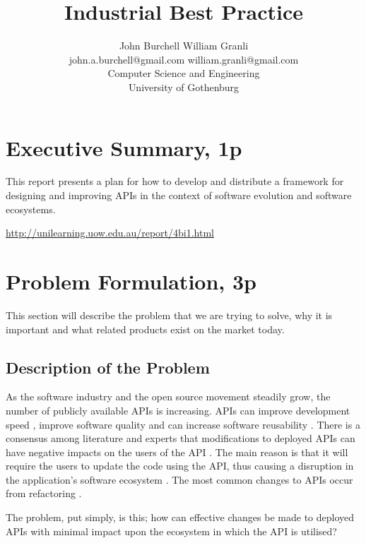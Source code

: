 \documentclass{article}
\title{Industrial Best Practice}
\begin{document}
\author{John Burchell \qquad William Granli \\
		john.a.burchell@gmail.com \qquad william.granli@gmail.com \\
		Computer Science and Engineering  \\
		University of Gothenburg }



\maketitle
\section{Executive Summary, 1p}
This report presents a plan for how to develop and distribute a framework for designing and improving APIs in the context of software evolution and software ecosystems. 

\url{http://unilearning.uow.edu.au/report/4bi1.html	}

\section{Problem Formulation, 3p}
This section will describe the problem that we are trying to solve, why it is important and what related products exist on the market today.

\subsection{Description of the Problem}

As the software industry and the open source movement steadily grow, the number of publicly available APIs is increasing. APIs can improve development speed \cite{stylos2006comparing}, improve software quality \cite{stylos2006comparing} and can increase software reusability \cite{afonso2012evaluating}. There is a consensus among literature and experts that modifications to deployed APIs can have negative impacts on the users of the API \cite{google_talk} \cite{mcdonnell2013empirical} \cite{robbes2012developers} \cite{henning2007api}. The main reason is that it will require the users to update the code using the API, thus causing a disruption in the application's software ecosystem \cite{messerschmitt2005software}. The most common changes to APIs occur from refactoring \cite{dig2005role} \cite{xing2006refactoring}.

The problem, put simply, is this; how can effective changes be made to deployed APIs with minimal impact upon the ecosystem in which the API is utilised?
\end{document}
